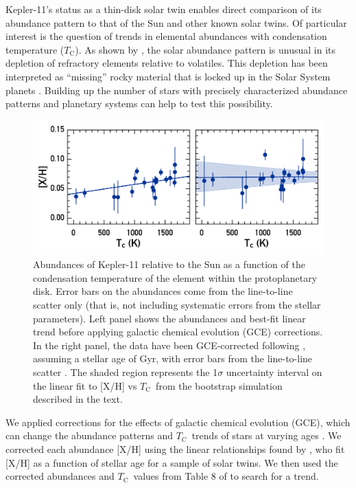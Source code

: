 \documentclass[twocolumn,trackchanges]{aastex61}
\newcommand{\tc}{$T_\mathrm{C}$}
\begin{document}
Kepler-11's status as a thin-disk solar twin enables direct comparison of its abundance pattern to that of the Sun and other known solar twins. Of particular interest is the question of trends in elemental abundances with condensation temperature (\tc). As shown by \citet{Melendez2009}, the solar abundance pattern is unusual in its depletion of refractory elements relative to volatiles. This depletion has been interpreted as ``missing'' rocky material that is locked up in the Solar System planets \citep{Chambers2010}. Building up the number of stars with precisely characterized abundance patterns and planetary systems can help to test this possibility.


\begin{figure}
\centering
\includegraphics[scale=0.6]{K11_Tc_linear}
\caption{Abundances of Kepler-11 relative to the Sun as a function of the condensation temperature of the element within the protoplanetary disk. Error bars on the abundances come from the line-to-line scatter only (that is, not including systematic errors from the stellar parameters). Left panel shows the abundances and best-fit linear trend before applying galactic chemical evolution (GCE) corrections. In the right panel, the data have been GCE-corrected following \citet{Spina2016b}, assuming a stellar age of  Gyr, with error bars from the line-to-line scatter . The shaded region represents the 1$\sigma$ uncertainty interval on the linear fit to [X/H] vs \tc\ from the bootstrap simulation described in the text.}
\label{fig:tc}
\end{figure}

We applied corrections for the effects of galactic chemical evolution (GCE), which can change the abundance patterns and \tc\ trends of stars at varying ages \citep{Nissen2015, Spina2016}. We corrected each abundance [X/H] using the linear relationships found by \citet{Spina2016b}, who fit [X/H] as a function of stellar age for a sample of solar twins. We then used the corrected abundances and \tc\ values from Table 8 of \citet{Lodders2003} to search for a trend.
\end{document}
